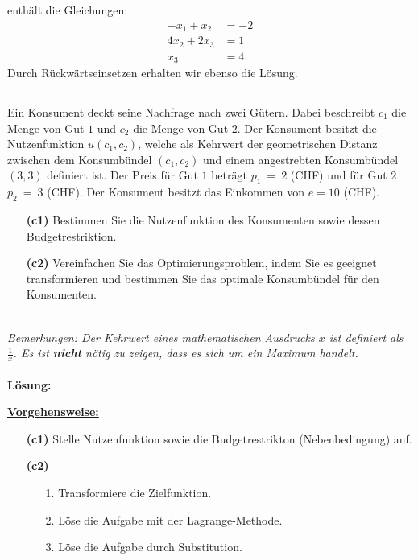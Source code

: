 enthält die Gleichungen:
\begin{align*}
	-x_1 + x_2 &= -2 \\
	4 x_2 + 2 x_3 &= 1 \\
	x_3 &= 4.
\end{align*}
Durch Rückwärtseinsetzen erhalten wir ebenso die Lösung.
\newpage
\subsection*{}
Ein Konsument deckt seine Nachfrage nach zwei Gütern. Dabei beschreibt $ c_1 $ die Menge von Gut $ 1 $ und $ c_2 $ die Menge von Gut $ 2 $. Der Konsument besitzt die Nutzenfunktion $ u(c_1,c_2) $, welche als Kehrwert der geometrischen Distanz zwischen dem Konsumbündel $ (c_1,c_2) $ und einem angestrebten Konsumbündel $ (3,3) $ definiert ist. Der Preis für Gut $ 1 $ beträgt $ p_1 \ = \ 2 $ (CHF) und für Gut $ 2 $ $ p_2 \ = \ 3 $ (CHF). Der Konsument besitzt das Einkommen von $ e = 10 $ (CHF).
\begin{enumerate}
	\item[\textbf{(c1)}] 
	Bestimmen Sie die Nutzenfunktion des Konsumenten sowie dessen Budgetrestriktion.
	\item[\textbf{(c2)}]
	Vereinfachen Sie das Optimierungsproblem, indem Sie es geeignet transformieren und bestimmen Sie das optimale Konsumbündel für den Konsumenten.
\end{enumerate}
\ \\
\textit{Bemerkungen: Der Kehrwert eines mathematischen Ausdrucks $ x $ ist definiert als $ \frac{1}{x} $. Es ist \textbf{nicht} nötig zu zeigen, dass es sich um ein Maximum handelt.}
\\ \\
\textbf{Lösung:}
\begin{mdframed}
\underline{\textbf{Vorgehensweise:}}
\begin{enumerate}
\item[\textbf{(c1)}] Stelle Nutzenfunktion sowie die Budgetrestrikton (Nebenbedingung) auf.
\item[\textbf{(c2)}]
\begin{enumerate}
	\item[1.] Transformiere die Zielfunktion.
	\item[2.] Löse die Aufgabe mit der Lagrange-Methode.
	\item[3.] Löse die Aufgabe durch Substitution.
\end{enumerate}
\end{enumerate}
\end{mdframed}

